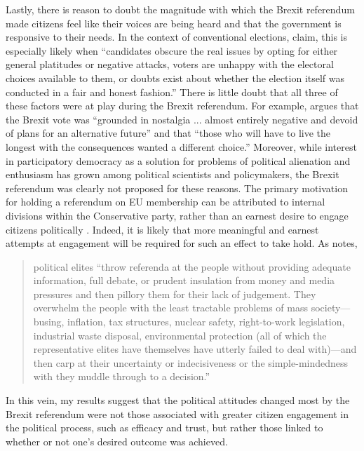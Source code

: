 \documentclass[12pt, letter]{article}
\begin{document}
Lastly, there is reason to doubt the magnitude with which the Brexit referendum made citizens feel like their voices are being heard and that the government is responsive to their needs. In the context of conventional elections, \textcite[579]{craig2006winners} claim, this is especially likely when “candidates obscure the real issues by opting for either general platitudes or negative attacks, voters are unhappy with the electoral choices available to them, or doubts exist about whether the election itself was conducted in a fair and honest fashion.” There is little doubt that all three of these factors were at play during the Brexit referendum. For example, \textcite[50]{calhoun2016brexit} argues that the Brexit vote was ``grounded in nostalgia ... almost entirely negative and devoid of plans for an alternative future'' and that ``those who will have to live the longest with the consequences wanted a different choice.'' Moreover, while interest in participatory democracy as a solution for problems of political alienation and enthusiasm has grown among political scientists and policymakers, the Brexit referendum was clearly not proposed for these reasons. The primary motivation for holding a referendum on EU membership can be attributed to internal divisions within the Conservative party, rather than an earnest desire to engage citizens politically \parencite{hobolt2016public, moore2017policy, prosser2016calling}. Indeed, it is likely that more meaningful and earnest attempts at engagement will be required for such an effect to take hold. As \textcite[154]{barber2003strong} notes,

\begin{quote}
political elites ``throw referenda at the people without providing adequate information, full debate, or prudent insulation from money and media pressures and then pillory them for their lack of judgement. They overwhelm the people with the least tractable problems of mass society---busing, inflation, tax structures, nuclear safety, right-to-work legislation, industrial waste disposal, environmental protection (all of which the representative elites have themselves have utterly failed to deal with)---and then carp at their uncertainty or indecisiveness or the simple-mindedness with they muddle through to a decision.'' 
\end{quote}

In this vein, my results suggest that the political attitudes changed most by the Brexit referendum were not those associated with greater citizen engagement in the political process, such as efficacy and trust, but rather those linked to whether or not one's desired outcome was achieved. 
\end{document}

